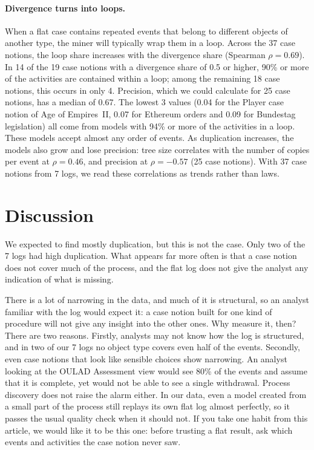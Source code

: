\documentclass[pdflatex,sn-mathphys-num]{sn-jnl}
\begin{document}
\paragraph{Divergence turns into loops.} When a flat case contains repeated events that belong to different objects of another type, the miner will typically wrap them in a loop. Across the 37 case notions, the loop share increases with the divergence share (Spearman $\rho = 0.69$). In 14 of the 19 case notions with a divergence share of 0.5 or higher, 90\% or more of the activities are contained within a loop; among the remaining 18 case notions, this occurs in only 4. Precision, which we could calculate for 25 case notions, has a median of 0.67. The lowest 3 values (0.04 for the Player case notion of Age of Empires~II, 0.07 for Ethereum orders and 0.09 for Bundestag legislation) all come from models with 94\% or more of the activities in a loop. These models accept almost any order of events. As duplication increases, the models also grow and lose precision: tree size correlates with the number of copies per event at $\rho = 0.46$, and precision at $\rho = -0.57$ (25 case notions). With 37 case notions from 7 logs, we read these correlations as trends rather than laws.

\section{Discussion}\label{sec:discussion}

We expected to find mostly duplication, but this is not the case. Only two of the 7 logs had high duplication. What appears far more often is that a case notion does not cover much of the process, and the flat log does not give the analyst any indication of what is missing.

There is a lot of narrowing in the data, and much of it is structural, so an analyst familiar with the log would expect it: a case notion built for one kind of procedure will not give any insight into the other ones. Why measure it, then? There are two reasons. Firstly, analysts may not know how the log is structured, and in two of our 7 logs no object type covers even half of the events. Secondly, even case notions that look like sensible choices show narrowing. An analyst looking at the OULAD Assessment view would see 80\% of the events and assume that it is complete, yet would not be able to see a single withdrawal. Process discovery does not raise the alarm either. In our data, even a model created from a small part of the process still replays its own flat log almost perfectly, so it passes the usual quality check when it should not. If you take one habit from this article, we would like it to be this one: before trusting a flat result, ask which events and activities the case notion never saw.
\end{document}
